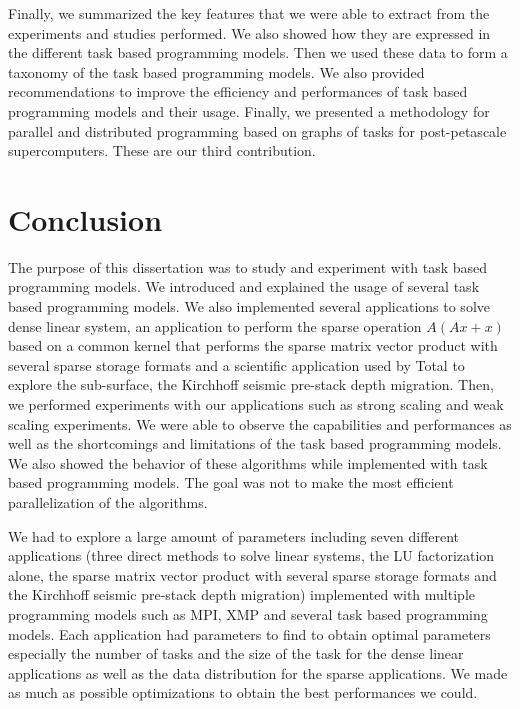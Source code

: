 Finally, we summarized the key features that we were able to extract from the experiments and studies performed.
We also showed how they are expressed in the different task based programming models.
Then we used these data to form a taxonomy of the task based programming models.
We also provided recommendations to improve the efficiency and performances of task based programming models and their usage.
Finally, we presented a methodology for parallel and distributed programming based on graphs of tasks for post-petascale supercomputers.
These are our third contribution.

\section{Conclusion}
The purpose of this dissertation was to study and experiment with task based programming models.
We introduced and explained the usage of several task based programming models.
We also implemented several applications to solve dense linear system, an application to perform the sparse operation $A(Ax+x)$ based on a common kernel that performs the sparse matrix vector product with several sparse storage formats and a scientific application used by Total to explore the sub-surface, the Kirchhoff seismic pre-stack depth migration.
Then, we performed experiments with our applications such as strong scaling and weak scaling experiments.
We were able to observe the capabilities and performances as well as the shortcomings and limitations of the task based programming models.
We also showed the behavior of these algorithms while implemented with task based programming models.
The goal was not to make the most efficient parallelization of the algorithms.

We had to explore a large amount of parameters including seven different applications (three direct methods to solve linear systems, the LU factorization alone, the sparse matrix vector product with several sparse storage formats and the Kirchhoff seismic pre-stack depth migration) implemented with multiple programming models such as MPI, XMP and several task based programming models.
Each application had parameters to find to obtain optimal parameters especially the number of tasks and the size of the task for the dense linear applications as well as the data distribution for the sparse applications.
We made as much as possible optimizations to obtain the best performances we could.

